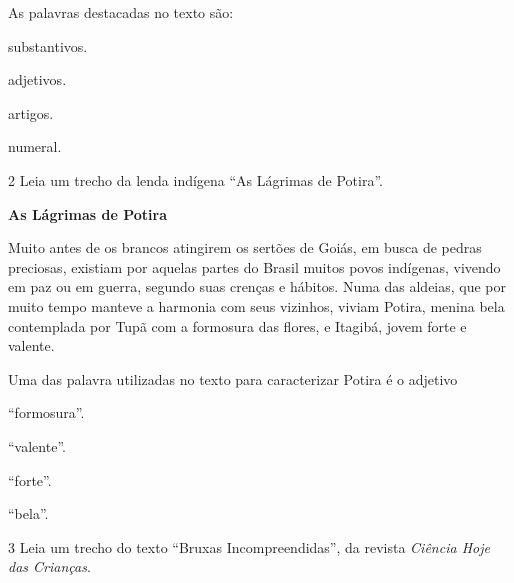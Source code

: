 As palavras destacadas no texto são:

\begin{escolha}
\item substantivos.

\item adjetivos.

\item artigos.

\item numeral.
\end{escolha}

\num{2} Leia um trecho da lenda indígena ``As Lágrimas de Potira''.

\begin{myquote}
\textbf{As Lágrimas de Potira}

Muito antes de os brancos atingirem os sertões de Goiás, em busca de
pedras preciosas, existiam por aquelas partes do Brasil muitos povos
indígenas, vivendo em paz ou em guerra, segundo suas crenças e hábitos.
Numa das aldeias, que por muito tempo manteve a harmonia com seus
vizinhos, viviam Potira, menina bela contemplada por Tupã com a formosura das
flores, e Itagibá, jovem forte e valente. 

\end{myquote}

Uma das palavra utilizadas no texto para caracterizar Potira é o adjetivo

\begin{escolha}
\item ``formosura''.

\item ``valente''.

\item ``forte''.

\item ``bela''.
\end{escolha}

\pagebreak
\num{3} Leia um trecho do texto ``Bruxas Incompreendidas'',
da revista \textit{Ciência Hoje das Crianças}.

